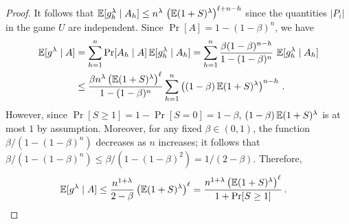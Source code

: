 \begin{proof}
        It follows that
        $
            \operatorname{\mathbb{E}} [g_h^\lambda \mid A_h]
            \leq 
                n^\lambda\, 
                \left(\operatorname{\mathbb{E}} (1 + S)^\lambda\right)^{\ell + n - h} 
        $ 
        since 
        the quantities $|P_{i}|$ in the game $U$ are independent. 
        Since $\Pr[A] = 1 - (1 - \beta)^n$, we have 
        \begin{align*}
            \operatorname{\mathbb{E}} [g^\lambda \mid A]
                &=
                \sum_{h = 1}^n \Pr[A_h \mid A] 
                    \operatorname{\mathbb{E}} [g_h^\lambda \mid A_h] 
                =
                \sum_{h = 1}^n 
                    \frac{\beta (1 - \beta)^{n-h}}{1 - (1 - \beta)^n}\,
                    \operatorname{\mathbb{E}} [g_h^\lambda \mid A_h] \\
                &\leq 
                    \frac{\beta n^\lambda
                    \left(\operatorname{\mathbb{E}} (1 + S)^\lambda\right)^{\ell}}{1 - (1 - \beta)^n}                     
                    \sum_{h=1}^n 
                    \left( (1 - \beta) \operatorname{\mathbb{E}} (1 + S)^\lambda \right)^{n-h}
                \,.
        \end{align*}
        However, 
        since $\Pr[S \geq 1] = 1 - \Pr[S = 0] = 1 - \beta$, 
        $(1 - \beta) \operatorname{\mathbb{E}} (1 + S)^\lambda$ is at most $1$ by assumption. 
        Moreover, for any fixed $\beta \in (0,1)$, 
        the function $\beta/(1 - (1 - \beta)^n)$ decreases as $n$ increases; 
        it follows that 
        $\beta/(1 - (1 - \beta)^n) \leq \beta/(1 - (1 - \beta)^2) = 1/(2 - \beta)$. 
        Therefore, 
        \begin{align*}
            \operatorname{\mathbb{E}} [g^\lambda \mid A]
            &\leq 
            \frac{n^{1 + \lambda}}{2 - \beta}
            \left(\operatorname{\mathbb{E}} (1 + S)^\lambda\right)^{\ell}
            = 
            \frac{n^{1 + \lambda} \left(\operatorname{\mathbb{E}} (1 + S)^\lambda\right)^{\ell}}{1 + \Pr[S \geq 1]}            
            \,.
        \end{align*}

    \end{proof}

%


